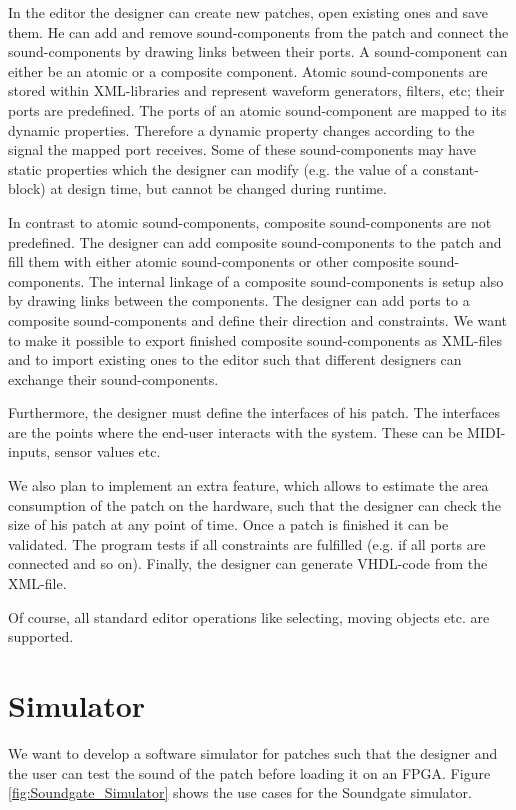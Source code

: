 In the editor the designer can create new patches, open existing ones and save them.
He can add and remove sound-components from the patch and connect the sound-components by drawing links between their ports.
A sound-component can either be an atomic or a composite component. 
Atomic sound-components are stored within XML-libraries and represent waveform generators, filters, etc; their ports are predefined. 
The ports of an atomic sound-component are mapped to its dynamic properties. Therefore a dynamic property changes according to the signal the mapped port receives.  
Some of these sound-components may have static properties which the designer can modify (e.g. the value of a constant-block) at design time, but cannot be changed during runtime. 

In contrast to atomic sound-components, composite sound-components are not predefined. 
The designer can add composite sound-components to the patch and fill them with either atomic sound-components or other composite sound-components. The internal linkage of a composite sound-components is setup also by drawing links between the components.
The designer can add ports to a composite sound-components and define their direction and constraints. 
We want to make it possible to export finished composite sound-components as XML-files and to import existing ones to the editor such that different designers can exchange their sound-components.


Furthermore, the designer must define the interfaces of his patch. 
The interfaces are the points where the end-user interacts with the system. 
These can be MIDI-inputs, sensor values etc.

We also plan to implement an extra feature, which allows to estimate the area consumption of the patch on the hardware, such that the designer can check the size of his patch at any point of time. 
Once a patch is finished it can be validated. The program tests if all constraints are fulfilled (e.g. if all ports are connected and so on). Finally, the designer can generate VHDL-code from the XML-file.

Of course, all standard editor operations like selecting, moving objects etc. are supported.

\section{Simulator}

We want to develop a software simulator for patches such that the designer and the user can test the sound of the patch before loading it on an \ac{FPGA}. Figure \ref{fig:Soundgate_Simulator} shows the use cases for the Soundgate simulator.


